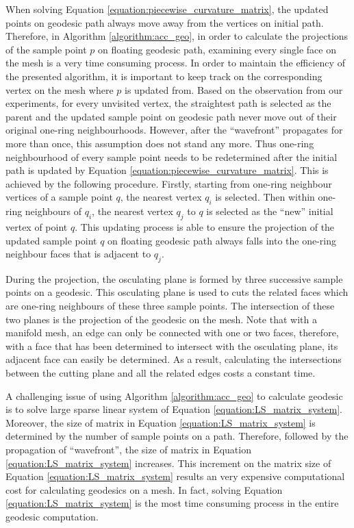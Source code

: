 When solving Equation \ref{equation:piecewise_curvature_matrix}, the updated points on geodesic path always move away from the vertices on initial path. Therefore, in Algorithm \ref{algorithm:acc_geo}, in order to calculate the projections of the sample point $p$ on floating geodesic path, examining every single face on the mesh is a very time consuming process. In order to maintain the efficiency of the presented algorithm, it is important to keep track on the corresponding vertex on the mesh where $p$ is updated from. Based on the observation from our experiments, for every unvisited vertex, the straightest path is selected as the parent and the updated sample point on geodesic path never move out of their original one-ring neighbourhoods. However, after the ``wavefront'' propagates for more than once, this assumption does not stand any more. Thus one-ring neighbourhood of every sample point needs to be redetermined after the initial path is updated by Equation \ref{equation:piecewise_curvature_matrix}. This is achieved by the following procedure. Firstly, starting from one-ring neighbour vertices of a sample point $q$, the nearest vertex $q_{i}$ is selected. Then within one-ring neighbours of $q_{i}$, the nearest vertex $q_{j}$ to $q$ is selected as the ``new'' initial vertex of point $q$. This updating process is able to ensure the projection of the updated sample point $q$ on floating geodesic path always falls into the one-ring neighbour faces that is adjacent to $q_{j}$.

During the projection, the osculating plane is formed by three successive sample points on a geodesic. This osculating plane is used to cuts the related faces which are one-ring neighbours of these three sample points. The intersection of these two planes is the projection of the geodesic on the mesh. Note that with a manifold mesh, an edge can only be connected with one or two faces, therefore, with a face that has been determined to intersect with the osculating plane, its adjacent face can easily be  determined. As a result, calculating the intersections between the cutting plane and all the related edges costs a constant time.

A challenging issue of using Algorithm \ref{algorithm:acc_geo} to calculate geodesic is to solve large sparse linear system of Equation \ref{equation:LS_matrix_system}. Moreover, the size of matrix in Equation \ref{equation:LS_matrix_system} is determined by the number of sample points on a path. Therefore, followed by the propagation of ``wavefront'', the size of matrix in Equation \ref{equation:LS_matrix_system} increases. This increment on the matrix size of Equation \ref{equation:LS_matrix_system} results an very expensive computational cost for calculating geodesics on a mesh. In fact, solving Equation \ref{equation:LS_matrix_system} is the most time consuming process in the entire geodesic computation. 

